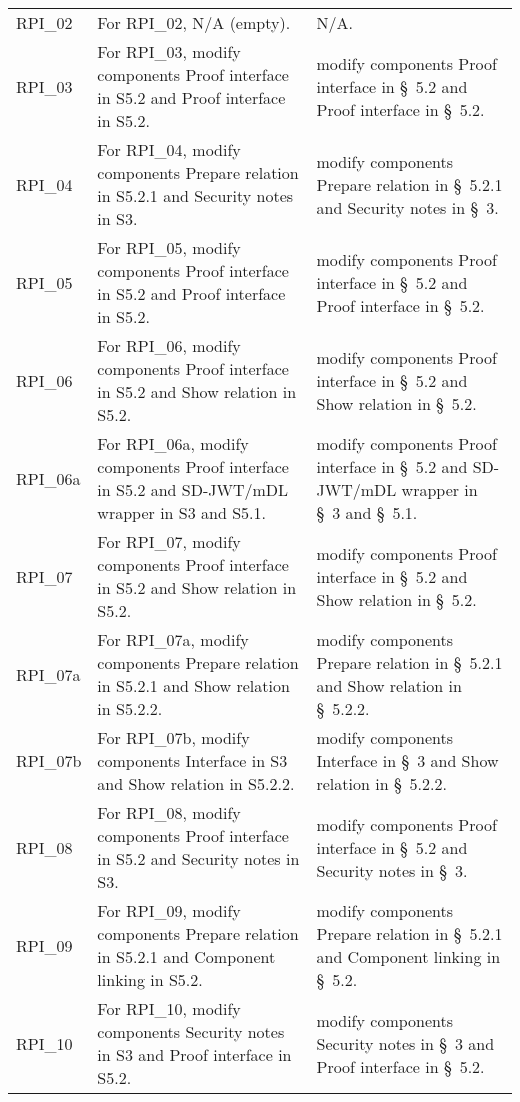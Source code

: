 \begin{landscape}
\begin{longtable}{p{3cm} p{10cm} p{7cm}}
RPI\_02 &
For RPI\_02, N/A (empty). &
N/A. \\

RPI\_03 &
For RPI\_03, modify components Proof interface in S5.2 and Proof interface in S5.2. &
modify components Proof interface in \S~5.2 and Proof interface in \S~5.2. \\

RPI\_04 &
For RPI\_04, modify components Prepare relation in S5.2.1 and Security notes in S3. &
modify components Prepare relation in \S~5.2.1 and Security notes in \S~3. \\

RPI\_05 &
For RPI\_05, modify components Proof interface in S5.2 and Proof interface in S5.2. &
modify components Proof interface in \S~5.2 and Proof interface in \S~5.2. \\

RPI\_06 &
For RPI\_06, modify components Proof interface in S5.2 and Show relation in S5.2. &
modify components Proof interface in \S~5.2 and Show relation in \S~5.2. \\

RPI\_06a &
For RPI\_06a, modify components Proof interface in S5.2 and SD-JWT/mDL wrapper in S3 and S5.1. &
modify components Proof interface in \S~5.2 and SD-JWT/mDL wrapper in \S~3 and \S~5.1. \\

RPI\_07 &
For RPI\_07, modify components Proof interface in S5.2 and Show relation in S5.2. &
modify components Proof interface in \S~5.2 and Show relation in \S~5.2. \\

RPI\_07a &
For RPI\_07a, modify components Prepare relation in S5.2.1 and Show relation in S5.2.2. &
modify components Prepare relation in \S~5.2.1 and Show relation in \S~5.2.2. \\

RPI\_07b &
For RPI\_07b, modify components Interface in S3 and Show relation in S5.2.2. &
modify components Interface in \S~3 and Show relation in \S~5.2.2. \\

RPI\_08 &
For RPI\_08, modify components Proof interface in S5.2 and Security notes in S3. &
modify components Proof interface in \S~5.2 and Security notes in \S~3. \\

RPI\_09 &
For RPI\_09, modify components Prepare relation in S5.2.1 and Component linking in S5.2. &
modify components Prepare relation in \S~5.2.1 and Component linking in \S~5.2. \\

RPI\_10 &
For RPI\_10, modify components Security notes in S3 and Proof interface in S5.2. &
modify components Security notes in \S~3 and Proof interface in \S~5.2. \\

\end{longtable}
\end{landscape}




